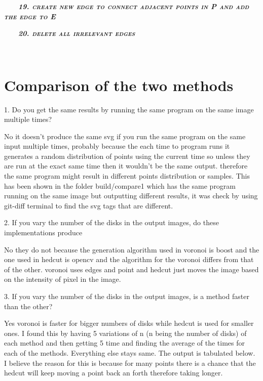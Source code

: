 \documentclass[11pt,a4paper]{article}
\begin{document}
\ \ \ \ \textbf{\textit{\textsc{\textsc{19. create new edge to
connect adjacent points in P and add the edge to E}}}}

\ \ \ \ \textbf{\textit{\textsc{\textsc{20. delete all irrelevant
edges}}}}



\ \ \ \ \textbf{\textit{\textsc{}}}

\item \textbf{\textit{\textsc{}}}

\section{Comparison of the two methods}

1. Do you get the same results by running the same program on the same
image multiple times?

No it doesn't produce the same svg if you run the same program on the
same input multiple times, probably because the each time to program
runs it generates a random distribution of points using the current time
so unless they are run at the exact same time then it wouldn't be the
same output. therefore the same program might result in different points
distribution or samples. This has been shown in the folder
build/compare1 which has the same program running on the same image but
outputting different results, it was check by using git-diff terminal to
find the svg tags that are different.



2. If you vary the number of the disks in the output images, do these
implementations produce

No they do not because the generation algorithm used in voronoi is boost
and the one used in hedcut is opencv and the algorithm for the voronoi
differs from that of the other. voronoi uses edges and point and hedcut
just moves the image based on the intensity of pixel in the image.



3. If you vary the number of the disks in the output images, is a method
faster than the other?

Yes voronoi is faster for bigger numbers of disks while hedcut is used
for smaller ones. I found this by having 5 variations of n (n being the
number of disks) of each method and then getting 5 time and finding the
average of the times for each of the methods. Everything else stays
same. The output is tabulated below. I believe the reason for this is
because for many points there is a chance that the hedcut will keep
moving a point back an forth therefore taking longer.
\end{document}
